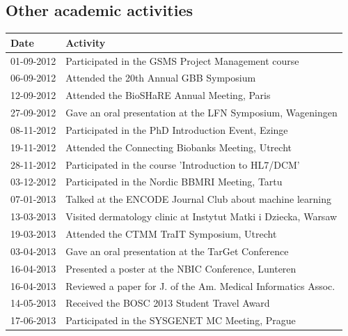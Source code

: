 \begin{appendices}
	\chapter{Other academic activities}
	
	\begin{table}
		\footnotesize
		\begin{tabulary}{\linewidth}{LL}
			Date & Activity \\
			\hline
			\rule{0pt}{2.5ex}\mbox{01-09-2012} & Participated in the GSMS Project Management course \\
			\rule{0pt}{2.5ex}\mbox{06-09-2012} & Attended the 20th Annual GBB Symposium \\
			\rule{0pt}{2.5ex}\mbox{12-09-2012} & Attended the BioSHaRE Annual Meeting, Paris \\
			\rule{0pt}{2.5ex}\mbox{27-09-2012} & Gave an oral presentation at the LFN Symposium, Wageningen \\
			\rule{0pt}{2.5ex}\mbox{08-11-2012} & Participated in the PhD Introduction Event, Ezinge \\
			\rule{0pt}{2.5ex}\mbox{19-11-2012} & Attended the Connecting Biobanks Meeting, Utrecht \\
			\rule{0pt}{2.5ex}\mbox{28-11-2012} & Participated in the course 'Introduction to HL7/DCM' \\
			\rule{0pt}{2.5ex}\mbox{03-12-2012} & Participated in the Nordic BBMRI Meeting, Tartu \\
			\rule{0pt}{2.5ex}\mbox{07-01-2013} & Talked at the ENCODE Journal Club about machine learning\\
			\rule{0pt}{2.5ex}\mbox{13-03-2013} & Visited dermatology clinic at Instytut Matki i Dziecka, Warsaw \\
			\rule{0pt}{2.5ex}\mbox{19-03-2013} & Attended the CTMM TraIT Symposium, Utrecht \\
			\rule{0pt}{2.5ex}\mbox{03-04-2013} & Gave an oral presentation at the TarGet Conference \\
			\rule{0pt}{2.5ex}\mbox{16-04-2013} & Presented a poster at the NBIC Conference, Lunteren \\
			\rule{0pt}{2.5ex}\mbox{16-04-2013} & Reviewed a paper for J. of the Am. Medical Informatics Assoc.  \\
			\rule{0pt}{2.5ex}\mbox{14-05-2013} & Received the BOSC 2013 Student Travel Award \\
			\rule{0pt}{2.5ex}\mbox{17-06-2013} & Participated in the SYSGENET MC Meeting, Prague \\

\end{tabulary}
\end{table}
\end{appendices}

